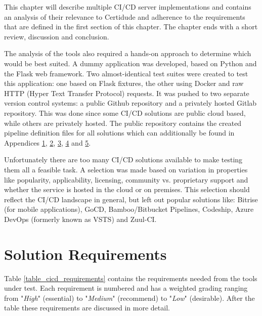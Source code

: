 This chapter will describe multiple CI/CD server implementations and contains an analysis of their relevance to Certidude and adherence to the requirements that are defined in the first section of this chapter. The chapter ends with a short review, discussion and conclusion.

The analysis of the tools also required a hands-on approach to determine which would be best suited. A dummy application was developed, based on Python and the Flask web framework. Two almost-identical test suites were created to test this application: one based on Flask fixtures, the other using Docker and raw HTTP (Hyper Text Transfer Protocol) requests. It was pushed to two separate version control systems: a public Github repository\cite{korving-example} and a privately hosted Gitlab repository. This was done since some CI/CD solutions are public cloud based, while others are privately hosted. The public repository contains the created pipeline definition files for all solutions  which can additionally be found in Appendices \hyperref[chapter:appendix-travis]{1}, \hyperref[chapter:appendix-jenkins]{2}, \hyperref[chapter:appendix-gitlab]{3}, \hyperref[chapter:appendix-tc]{4} and \hyperref[chapter:appendix-circleci]{5}.

Unfortunately there are too many CI/CD solutions available to make testing them all a feasible task. A selection was made based on variation in properties like popularity, applicability, licensing, community vs. proprietary support and whether the service is hosted in the cloud or on premises. This selection should reflect the CI/CD landscape in general, but left out popular solutions like: Bitrise (for mobile applications), GoCD, Bamboo/Bitbucket Pipelines, Codeship, Azure DevOps (formerly known as VSTS) and Zuul-CI.\cite{bitrise, gocd, vsts, bamboo, zuul}

\pagebreak

\section{Solution Requirements} \label{analysis:requirements}
Table \ref{table_cicd_requirements} contains the requirements needed from the tools under test. Each requirement is numbered and has a weighted grading ranging from "\textit{High}" (essential) to "\textit{Medium}" (recommend) to "\textit{Low}" (desirable).
After the table these requirements are discussed in more detail.

